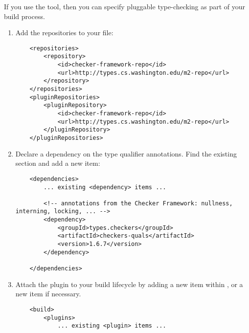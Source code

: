 If you use the  tool,
then you can specify pluggable type-checking as part of your build
process.

\begin{enumerate}

\item Add the repositories to your  file:

\begin{Verbatim}
    <repositories>
        <repository>
            <id>checker-framework-repo</id>
            <url>http://types.cs.washington.edu/m2-repo</url>
        </repository>
    </repositories>
    <pluginRepositories>
        <pluginRepository>
            <id>checker-framework-repo</id>
            <url>http://types.cs.washington.edu/m2-repo</url>
        </pluginRepository>
    </pluginRepositories>
\end{Verbatim}

\item Declare a dependency on the type qualifier annotations.  Find the
  existing  section and add a new
   item:

\begin{Verbatim}
    <dependencies>
        ... existing <dependency> items ...

        <!-- annotations from the Checker Framework: nullness, interning, locking, ... -->
        <dependency>
            <groupId>types.checkers</groupId>
            <artifactId>checkers-quals</artifactId>
            <version>1.6.7</version>
        </dependency>

    </dependencies>
\end{Verbatim}

\item Attach the plugin to your build lifecycle by adding a new
   item within , or a new 
  item if necessary.

\begin{Verbatim}
    <build>
        <plugins>
            ... existing <plugin> items ...


\end{Verbatim}
\end{enumerate}
